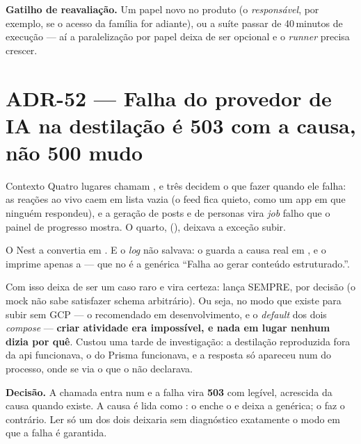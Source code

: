 \textbf{Gatilho de reavaliação.} Um papel novo no produto (o \emph{responsável},
por exemplo, se o acesso da família for adiante), ou a suíte passar de
40\,minutos de execução --- aí a paralelização por papel deixa de ser opcional e
o \emph{runner} precisa crescer.

\section{ADR-52 --- Falha do provedor de IA na destilação é 503 com a causa, não
500 mudo}
\label{adr:destilar-503}

\begin{especificacao}{Contexto}
Quatro lugares chamam , e três decidem o que fazer quando ele
falha: as reações ao vivo caem em lista vazia (o feed fica quieto, como um app em
que ninguém respondeu), e a geração de posts e de personas vira \emph{job} falho
que o painel de progresso mostra. O quarto, 
(), deixava a exceção subir.

O Nest a convertia em . E o \emph{log} não salvava: o  guarda a causa real
em , e o  imprime apenas a  --- que
no  é a genérica \enquote{Falha ao gerar conteúdo
estruturado.}.

Com  isso deixa de ser um caso raro e vira certeza:
 lança SEMPRE, por decisão (o mock não sabe
satisfazer schema arbitrário). Ou seja, no modo que existe para subir sem GCP ---
o recomendado em desenvolvimento, e o \emph{default} dos dois \emph{compose} ---
\textbf{criar atividade era impossível, e nada em lugar nenhum dizia por quê}.
Custou uma tarde de investigação: a destilação reproduzida fora da api
funcionava, o  do Prisma funcionava, e a resposta só apareceu num
 do processo, onde se via o  que o 
não declarava.
\end{especificacao}

\textbf{Decisão.} A chamada entra num  e a falha vira
\textbf{503} com  legível, acrescida da causa quando existe. A causa
é lida como : o  enche o
 e deixa a  genérica; o  faz o
contrário. Ler só um dos dois deixaria sem diagnóstico exatamente o modo em que a
falha é garantida.

